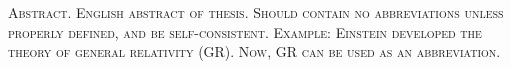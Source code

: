 
\noindent \scshape\mdseries Abstract. \normalfont
English abstract of thesis. Should contain no abbreviations unless properly defined, and be self-consistent. 
Example: Einstein developed the theory of general relativity (GR). Now, GR can be used as an abbreviation.


\cleardoublepage